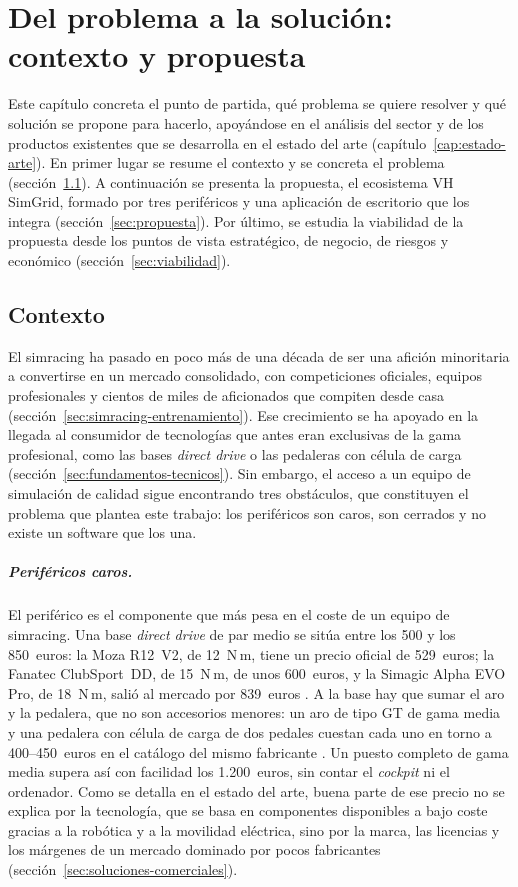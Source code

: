 \chapter{Del problema a la solución: contexto y propuesta}
\label{cap:problema-solucion}
Este capítulo concreta el punto de partida, qué problema se quiere resolver y qué solución se propone para hacerlo, apoyándose en el análisis del sector y de los productos existentes que se desarrolla en el estado del arte (capítulo~\ref{cap:estado-arte}). En primer lugar se resume el contexto y se concreta el problema (sección~\ref{sec:contexto}). A continuación se presenta la propuesta, el ecosistema VH SimGrid, formado por tres periféricos y una aplicación de escritorio que los integra (sección~\ref{sec:propuesta}). Por último, se estudia la viabilidad de la propuesta desde los puntos de vista estratégico, de negocio, de riesgos y económico (sección~\ref{sec:viabilidad}).

\section{Contexto}
\label{sec:contexto}
El simracing ha pasado en poco más de una década de ser una afición minoritaria a convertirse en un mercado consolidado, con competiciones oficiales, equipos profesionales y cientos de miles de aficionados que compiten desde casa (sección~\ref{sec:simracing-entrenamiento}). Ese crecimiento se ha apoyado en la llegada al consumidor de tecnologías que antes eran exclusivas de la gama profesional, como las bases \textit{direct drive} o las pedaleras con célula de carga (sección~\ref{sec:fundamentos-tecnicos}). Sin embargo, el acceso a un equipo de simulación de calidad sigue encontrando tres obstáculos, que constituyen el problema que plantea este trabajo: los periféricos son caros, son cerrados y no existe un software que los una.

\paragraph{Periféricos caros.}
El periférico es el componente que más pesa en el coste de un equipo de simracing. Una base \textit{direct drive} de par medio se sitúa entre los 500 y los 850~euros: la Moza R12~V2, de 12~N\,m, tiene un precio oficial de 529~euros; la Fanatec ClubSport~DD, de 15~N\,m, de unos 600~euros, y la Simagic Alpha EVO Pro, de 18~N\,m, salió al mercado por 839~euros \parencite{moza_web, fanatec_web, bsimracing_2025_alpha_evo}. A la base hay que sumar el aro y la pedalera, que no son accesorios menores: un aro de tipo GT de gama media y una pedalera con célula de carga de dos pedales cuestan cada uno en torno a 400--450~euros en el catálogo del mismo fabricante \parencite{moza_web}. Un puesto completo de gama media supera así con facilidad los 1.200~euros, sin contar el \textit{cockpit} ni el ordenador. Como se detalla en el estado del arte, buena parte de ese precio no se explica por la tecnología, que se basa en componentes disponibles a bajo coste gracias a la robótica y a la movilidad eléctrica, sino por la marca, las licencias y los márgenes de un mercado dominado por pocos fabricantes (sección~\ref{sec:soluciones-comerciales}).

